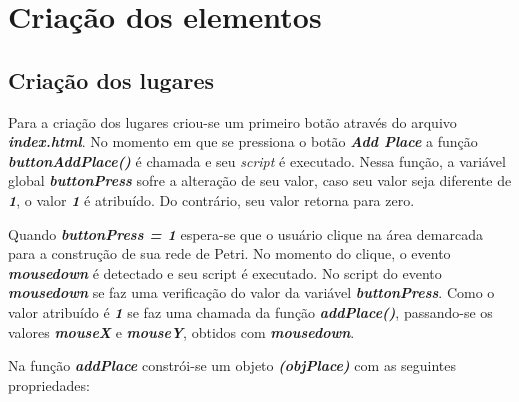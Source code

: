 \documentclass[
	12pt,				%
	openright,			%
	oneside,			%
	a4paper,			%
	english,			%
	brazil				%
	]{abntex2}
\theoremstyle{doispontos}
\begin{document}
\section{Criação dos elementos}

\subsection{Criação dos lugares}

Para a criação dos lugares criou-se um primeiro botão através do arquivo \textit{\textbf{index.html}}. No momento em que se pressiona o botão \textit{\textbf{Add Place}} a função \textit{\textbf{buttonAddPlace()}} é chamada e seu \textit{script} é executado. Nessa função, a variável global \textit{\textbf{buttonPress}} sofre a alteração de seu valor, caso seu valor seja diferente de \textit{\textbf{1}}, o valor \textit{\textbf{1}} é atribuído. Do contrário, seu valor retorna para zero.



Quando \textit{\textbf{buttonPress = 1}} espera-se que o usuário clique na área demarcada para a construção de sua rede de Petri. No momento do clique, o evento \textit{\textbf{mousedown}} é detectado e seu script é executado. No script do evento \textit{\textbf{mousedown}} se faz uma verificação do valor da variável \textit{\textbf{buttonPress}}. Como o valor atribuído é \textit{\textbf{1}} se faz uma chamada da função \textit{\textbf{addPlace()}}, passando-se os valores \textbf{\textit{mouseX}} e \textbf{\textit{mouseY}}, obtidos com \textbf{\textit{mousedown}}. 



Na função \textbf{\textit{addPlace}} constrói-se um objeto \textbf{\textit{(objPlace)}} com as seguintes propriedades: 
\end{document}
